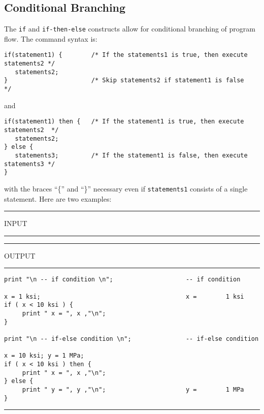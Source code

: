 \subsection{Conditional Branching}

\vspace{0.15 in}
\noindent\hspace{0.5 in}
The {\tt if} and {\tt if-then-else} constructs allow 
for conditional branching of program flow.
The command syntax is:

\begin{footnotesize}
\begin{verbatim}
if(statement1) {        /* If the statements1 is true, then execute statements2 */
   statements2;
}                       /* Skip statements2 if statement1 is false              */
\end{verbatim}
\end{footnotesize}
\vspace{ 0.05 in}

\noindent and 
\vspace{ 0.05 in}

\begin{footnotesize}
\begin{verbatim}
if(statement1) then {   /* If the statement1 is true, then execute statements2  */
   statements2;
} else {
   statements3;         /* If the statement1 is false, then execute statements3 */
}
\end{verbatim}
\end{footnotesize}

\vspace{ 0.15 in}\noindent
with the braces ``\{'' and ``\}'' necessary even if
{\tt statements1} consists of a single statement.
Here are two examples:

\vspace{0.15 in}
\begin{footnotesize}
\noindent
\rule{1.2 in}{0.035 in} INPUT \rule{1.2 in}{0.035 in}\hspace{0.1 in}
\rule{1.3 in}{0.035 in} OUTPUT\rule{1.3 in}{0.035 in}
\begin{verbatim}
print "\n -- if condition \n";                    -- if condition 

x = 1 ksi;                                        x =        1 ksi
if ( x < 10 ksi ) {
     print " x = ", x ,"\n";
}

print "\n -- if-else condition \n";               -- if-else condition 

x = 10 ksi; y = 1 MPa;
if ( x < 10 ksi ) then {
     print " x = ", x ,"\n";
} else {
     print " y = ", y ,"\n";                      y =        1 MPa
}
\end{verbatim}
\rule{6.25 in}{0.035 in}
\end{footnotesize}


